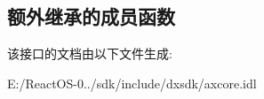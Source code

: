 \subsection*{额外继承的成员函数}


该接口的文档由以下文件生成\+:\begin{DoxyCompactItemize}
\item 
E\+:/\+React\+O\+S-\/0../sdk/include/dxsdk/axcore.\+idl\end{DoxyCompactItemize}
